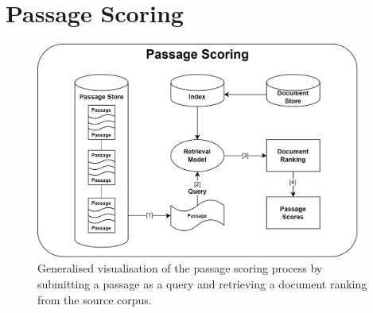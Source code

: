 \section{Passage Scoring}\label{passage-scoring}

\begin{figure}[ht]
    \centering
    \includegraphics[width=0.95\textwidth]{./graphics/drawio/passage_scoring.png}
    \caption{Generalised visualisation of the passage scoring process by submitting a passage as a query and retrieving a document ranking from the source corpus.}
    \label{fig:passage-scoring}
\end{figure}

